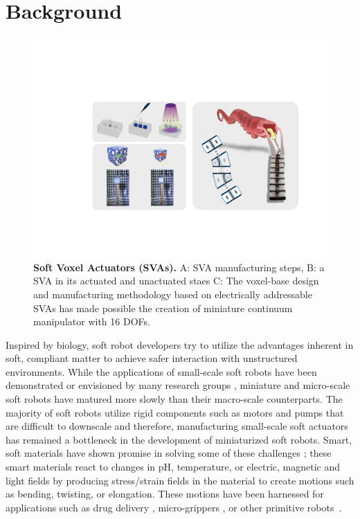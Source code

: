 \section{Background}
\begin{figure}[t]
      \centering
      \includegraphics[width=\textwidth]{concept4.pdf}
      \caption[Soft Voxel Actuators (SVAs)]{\textbf{Soft Voxel Actuators (SVAs).} A: SVA manufacturing steps, B: a SVA in its actuated and unactuated staes C: The voxel-base design and manufacturing methodology based on electrically addressable SVAs has made possible the creation of miniature continuum manipulator with 16 DOFs.}
      \label{fig:conceptSVA}
\end{figure}
Inspired by biology, soft robot developers try to utilize the advantages inherent in soft, compliant matter to achieve safer interaction with unstructured environments.  
While the applications of small-scale soft robots have been demonstrated or envisioned by many research groups \cite{Hines2017}, miniature and micro-scale soft robots have matured more slowly than their  macro-scale counterparts. The majority of soft robots utilize rigid components such as motors and pumps that are difficult to downscale \cite{Majidi2019} and therefore, manufacturing small-scale soft actuators has remained a bottleneck in the development of miniaturized soft robots. Smart, soft materials have shown promise in solving some of these challenges \cite{Steele2018, Stuart2010, White2013}; these smart materials react to changes in pH, temperature, or electric, magnetic and light fields by producing stress/strain fields in the material to create motions such as bending, twisting, or elongation. These motions have been harnessed for applications such as drug delivery \cite{ghosh2017}, micro-grippers \cite{shintake2018}, or other primitive robots~\cite{Ionov2014}. %
